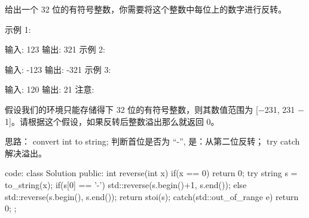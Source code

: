 给出一个 32 位的有符号整数，你需要将这个整数中每位上的数字进行反转。

示例 1:

输入: 123
输出: 321
 示例 2:

输入: -123
输出: -321
示例 3:

输入: 120
输出: 21
注意:

假设我们的环境只能存储得下 32 位的有符号整数，则其数值范围为 [−231,  231 − 1]。请根据这个假设，如果反转后整数溢出那么就返回 0。

思路：
convert int to string;
判断首位是否为 “-”, 是：从第二位反转；
try catch 解决溢出。













code:
class Solution {
public:
    int reverse(int x) {
        if(x == 0) return 0;
        try
        {
            string s = to_string(x);
            if(s[0] == '-')
                std::reverse(s.begin()+1, s.end());
            else
                std::reverse(s.begin(), s.end());
            return stoi(s);
        }
        catch(std::out_of_range e)
        {
            return 0;
        }
    }
};